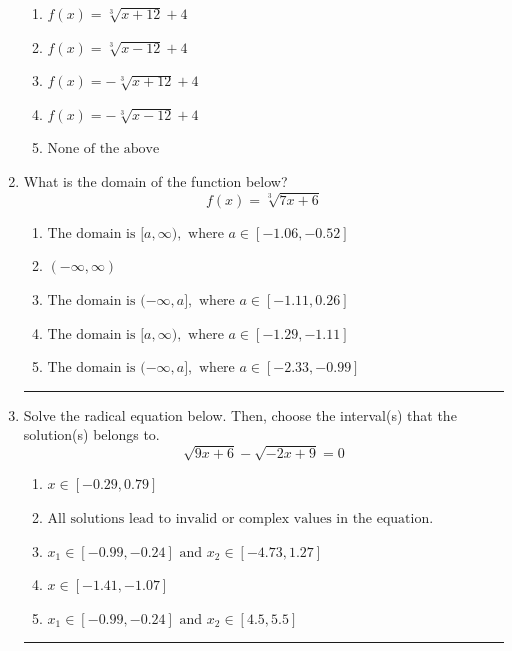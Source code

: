 \documentclass[14pt]{extbook}
\newcommand{\litem}[1]{\item#1\hspace*{-1cm}\rule{\textwidth}{0.4pt}}
\begin{document}
\begin{enumerate}
{\begin{center}
\end{center}
\begin{enumerate}[label=\Alph*.]
\item \( f(x) = \sqrt[3]{x + 12} + 4 \)
\item \( f(x) = \sqrt[3]{x - 12} + 4 \)
\item \( f(x) = - \sqrt[3]{x + 12} + 4 \)
\item \( f(x) = - \sqrt[3]{x - 12} + 4 \)
\item \( \text{None of the above} \)

\end{enumerate} }
\litem{
What is the domain of the function below?\[ f(x) = \sqrt[3]{7 x + 6} \]\begin{enumerate}[label=\Alph*.]
\item \( \text{The domain is } [a, \infty), \text{   where } a \in [-1.06, -0.52] \)
\item \( (-\infty, \infty) \)
\item \( \text{The domain is } (-\infty, a], \text{   where } a \in [-1.11, 0.26] \)
\item \( \text{The domain is } [a, \infty), \text{   where } a \in [-1.29, -1.11] \)
\item \( \text{The domain is } (-\infty, a], \text{   where } a \in [-2.33, -0.99] \)

\end{enumerate} }
\litem{
Solve the radical equation below. Then, choose the interval(s) that the solution(s) belongs to.\[ \sqrt{9 x + 6} - \sqrt{-2 x + 9} = 0 \]\begin{enumerate}[label=\Alph*.]
\item \( x \in [-0.29,0.79] \)
\item \( \text{All solutions lead to invalid or complex values in the equation.} \)
\item \( x_1 \in [-0.99, -0.24] \text{ and } x_2 \in [-4.73,1.27] \)
\item \( x \in [-1.41,-1.07] \)
\item \( x_1 \in [-0.99, -0.24] \text{ and } x_2 \in [4.5,5.5] \)

\end{enumerate} }
\end{enumerate}
\end{document}
